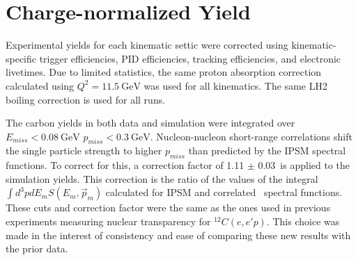 \section{Charge-normalized Yield}
Experimental yields for each kinematic settic were corrected using
kinematic-specific trigger efficiencies, PID efficiencies, tracking
efficiencies, and electronic livetimes.
Due to limited statistics, the same proton absorption correction calculated
using $Q^2=\SI{11.5}{\giga\electronvolt}$ was used for all kinematics.
The same LH2 boiling correction is used for all runs.


The carbon yields in both data and simulation were integrated over
$E_{miss} < \SI{0.08}{\giga\electronvolt}$
$p_{miss} < \SI{0.3}{\giga\electronvolt}$.
Nucleon-nucleon short-range correlations shift the single particle strength
to higher $p_{miss}$ than predicted by the IPSM spectral functions.
To correct for this, a correction factor of 1.11 $\pm$ 0.03\,\cite{ONeill_1995}
is applied to the simulation yields.
This correction is the ratio of the values of the integral
$\int d^3p dE_m S(E_m,\vec{p}_m)$
calculated for IPSM and correlated~\cite{VanOrden_1980} spectral functions.
These cuts and correction factor were the same as the ones used in
previous experiments measuring nuclear transparency for ${}^{12}C(e,e'p)$.
This choice was made in the interest of consistency and ease of comparing these
new results with the prior data.

